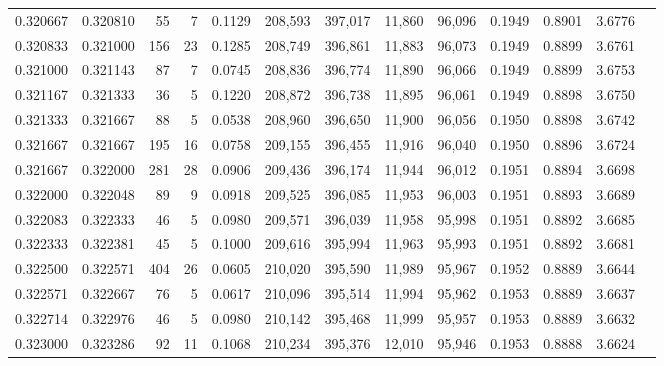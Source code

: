 \begin{tabular}{rrrrrrrrrrrrr}
0.320667 & 0.320810 &    55 &   7 &                                     0.1129 & 208,593 & 397,017 &  11,860 &  96,096 & 0.1949 & 0.8901 & 3.6776 \\
0.320833 & 0.321000 &   156 &  23 &                                     0.1285 & 208,749 & 396,861 &  11,883 &  96,073 & 0.1949 & 0.8899 & 3.6761 \\
0.321000 & 0.321143 &    87 &   7 &                                     0.0745 & 208,836 & 396,774 &  11,890 &  96,066 & 0.1949 & 0.8899 & 3.6753 \\
0.321167 & 0.321333 &    36 &   5 &                                     0.1220 & 208,872 & 396,738 &  11,895 &  96,061 & 0.1949 & 0.8898 & 3.6750 \\
0.321333 & 0.321667 &    88 &   5 &                                     0.0538 & 208,960 & 396,650 &  11,900 &  96,056 & 0.1950 & 0.8898 & 3.6742 \\
0.321667 & 0.321667 &   195 &  16 &                                     0.0758 & 209,155 & 396,455 &  11,916 &  96,040 & 0.1950 & 0.8896 & 3.6724 \\
0.321667 & 0.322000 &   281 &  28 &                                     0.0906 & 209,436 & 396,174 &  11,944 &  96,012 & 0.1951 & 0.8894 & 3.6698 \\
0.322000 & 0.322048 &    89 &   9 &                                     0.0918 & 209,525 & 396,085 &  11,953 &  96,003 & 0.1951 & 0.8893 & 3.6689 \\
0.322083 & 0.322333 &    46 &   5 &                                     0.0980 & 209,571 & 396,039 &  11,958 &  95,998 & 0.1951 & 0.8892 & 3.6685 \\
0.322333 & 0.322381 &    45 &   5 &                                     0.1000 & 209,616 & 395,994 &  11,963 &  95,993 & 0.1951 & 0.8892 & 3.6681 \\
0.322500 & 0.322571 &   404 &  26 &                                     0.0605 & 210,020 & 395,590 &  11,989 &  95,967 & 0.1952 & 0.8889 & 3.6644 \\
0.322571 & 0.322667 &    76 &   5 &                                     0.0617 & 210,096 & 395,514 &  11,994 &  95,962 & 0.1953 & 0.8889 & 3.6637 \\
0.322714 & 0.322976 &    46 &   5 &                                     0.0980 & 210,142 & 395,468 &  11,999 &  95,957 & 0.1953 & 0.8889 & 3.6632 \\
0.323000 & 0.323286 &    92 &  11 &                                     0.1068 & 210,234 & 395,376 &  12,010 &  95,946 & 0.1953 & 0.8888 & 3.6624 \\

\end{tabular}
